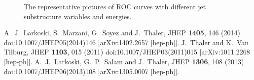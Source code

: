 \documentclass[a4paper]{PoS}
\begin{document}
\begin{figure}
\begin{center}
\end{center}
\caption{The representative pictures of ROC curves with different jet substructure variables and energies.}
\label{1}
\end{figure}

\begin{thebibliography}{99}
  A.~J.~Larkoski, S.~Marzani, G.~Soyez and J.~Thaler,
  JHEP {\bf 1405}, 146 (2014)
  doi:10.1007/JHEP05(2014)146
  [arXiv:1402.2657 [hep-ph]].
  J.~Thaler and K.~Van Tilburg,
  JHEP {\bf 1103}, 015 (2011)
  doi:10.1007/JHEP03(2011)015
  [arXiv:1011.2268 [hep-ph]].
  A.~J.~Larkoski, G.~P.~Salam and J.~Thaler,
  JHEP {\bf 1306}, 108 (2013)
  doi:10.1007/JHEP06(2013)108
  [arXiv:1305.0007 [hep-ph]].
\end{thebibliography}
\end{document}
